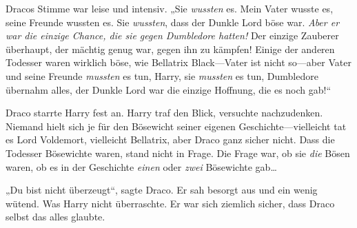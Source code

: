 Dracos Stimme war leise und intensiv. „Sie \emph{wussten} es. Mein Vater wusste es, seine Freunde wussten es. Sie \emph{wussten}, dass der Dunkle Lord böse war. \emph{Aber er war die einzige Chance, die sie gegen Dumbledore hatten!} Der einzige Zauberer überhaupt, der mächtig genug war, gegen ihn zu kämpfen! Einige der anderen Todesser waren wirklich böse, wie Bellatrix Black—Vater ist nicht so—aber Vater und seine Freunde \emph{mussten} es tun, Harry, sie \emph{mussten} es tun, Dumbledore übernahm alles, der Dunkle Lord war die einzige Hoffnung, die es noch gab!“

Draco starrte Harry fest an. Harry traf den Blick, versuchte nachzudenken. Niemand hielt sich je für den Bösewicht seiner eigenen Geschichte—vielleicht tat es Lord Voldemort, vielleicht Bellatrix, aber Draco ganz sicher nicht. Dass die Todesser Bösewichte waren, stand nicht in Frage. Die Frage war, ob sie \emph{die} Bösen waren, ob es in der Geschichte \emph{einen} oder \emph{zwei} Bösewichte gab…

„Du bist nicht überzeugt“, sagte Draco. Er sah besorgt aus und ein wenig wütend. Was Harry nicht überraschte. Er war sich ziemlich sicher, dass Draco selbst das alles glaubte.


